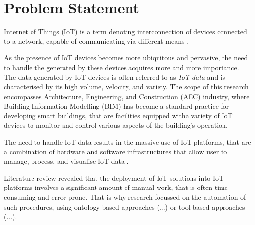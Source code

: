 \chapter{Problem Statement}
\label{chap:problemStatement}

Internet of Things (IoT) is a term denoting interconnection of devices connected to a network,
capable of communicating via different means \cite{berte_defining_2018}.

As the presence of IoT devices becomes more ubiquitous and pervasive, the need to handle the generated by these devices acquires more and more importance.
The data generated by IoT devices is often referred to as \textit{IoT data} and is characterised by its high volume, velocity, and variety.
The scope of this research encompasses Architecture, Engineering, and Construction (AEC) industry, where Building Information
Modelling (BIM) has become a standard practice for developing smart buildings, that are facilities equipped witha variety of IoT devices to monitor and control various aspects of the building's operation.

The need to handle IoT data results in the massive use of IoT platforms, that are a combination of hardware and software infrastructures that allow user to manage, process, and visualise IoT data \cite{babun_survey_2021} \cite{barros_anatomy_2022}.

Literature review revealed that the deployment of IoT solutions into IoT platforms involves a significant amount of manual work, that is often time-consuming and error-prone.
That is why research focussed on the automation of such procedures, using ontology-based approaches (...) or tool-based approaches (...).